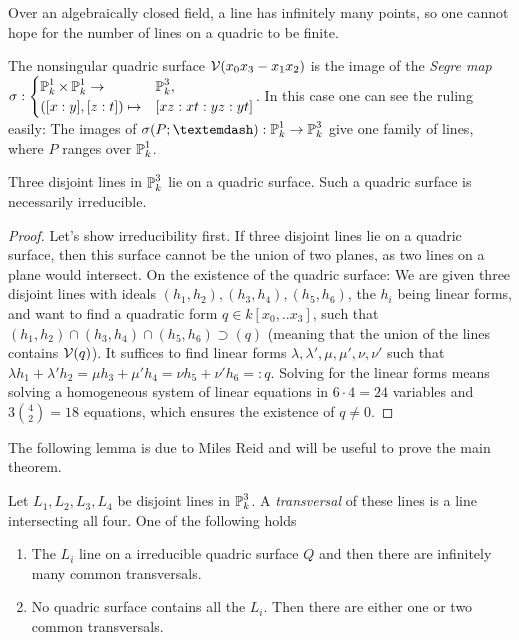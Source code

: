 \begin{remark}
Over an algebraically closed field, a line has infinitely many points, so one cannot hope for the number of lines on a quadric to be finite.
\end{remark}

\begin{remark}
The nonsingular quadric surface $\operatorname{\mathcal V}(x_0x_3 - x_1x_2)$ is the image of the \emph{Segre map} $\sigma : \begin{cases} \operatorname{\mathbb P}^1_k \times \operatorname{\mathbb P}^1_k \to& \operatorname{\mathbb P}^3_k,  \\ ([x:y],[z:t]) \mapsto& [xz:xt:yz:yt] \end{cases}$.
In this case one can see the ruling easily: The images of
$\sigma(P;\textemdash) : \proj^1_k \to \proj^3_k$ give one family of lines, where $P$ ranges over $\operatorname{\mathbb P}^1_k$.
\end{remark}


\begin{lemma} \label{lemmaThreeLines}
Three disjoint lines in $\operatorname{\mathbb P}^3_k$ lie on a quadric surface.
Such a quadric surface is necessarily irreducible.
\end{lemma}
\begin{proof}
Let's show irreducibility first.
If three disjoint lines lie on a quadric surface, then this surface cannot be the union of two planes, as two lines on a plane would intersect.
On the existence of the quadric surface:
We are given three disjoint lines with ideals $(h_1,h_2), (h_3,h_4), (h_5,h_6)$, the $h_i$ being linear forms, and want to find a quadratic form $q \in k[x_0,..x_3]$, such that $(h_1,h_2) \cap (h_3,h_4) \cap (h_5,h_6) \supset (q)$ (meaning that the union of the lines contains $\operatorname{\mathcal V}(q)$).
It suffices to find linear forms $\lambda,\lambda',\mu,\mu',\nu,\nu'$ such that
$\lambda h_1 + \lambda' h_2 = \mu h_3 + \mu' h_4 = \nu h_5 + \nu' h_6 =: q$.
Solving for the linear forms means solving a homogeneous system of linear equations in $6\cdot 4= 24$ variables and $3\binom{4}{2} = 18$ equations, which ensures the existence of $q \neq 0$.
\end{proof}

The following lemma is due to Miles Reid and will be useful to prove the main theorem.
\begin{lemma} \label{lemmaDisjointLines}
Let $L_1,L_2,L_3,L_4$ be disjoint lines in $\operatorname{\mathbb P}^3_k$.
A \emph{transversal} of these lines is a line intersecting all four.
One of the following holds
\begin{enumerate}
\item The $L_i$ line on a irreducible quadric surface $Q$ and then there are infinitely many common transversals.
\item No quadric surface contains all the $L_i$. Then there are either one or two common transversals.
\end{enumerate}
\end{lemma}

